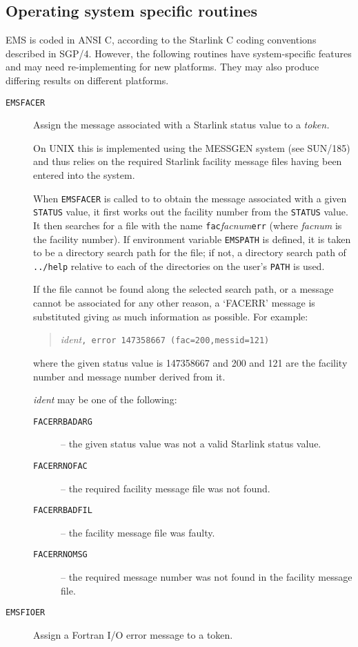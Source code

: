 \documentclass[twoside,11pt]{article}
\newcommand{\htmlref}[2]{#1}
\newcommand{\latex}[1]{#1}
\newcommand{\xref}[3]{#1}
\newcommand{\xlabel}[1]{}
\renewcommand{\_}{\texttt{\symbol{95}}}
\begin{document}
\subsection{\xlabel{operating_system_specific_routines}Operating system
specific routines}
\label{deps}
EMS is coded in ANSI C, according to the Starlink C coding conventions 
described in SGP/4.
However, the following routines have system-specific features and may need
re-implementing for new platforms.
They may also produce differing results on different platforms.
\begin {description}
\item [\htmlref{\texttt{EMS\_FACER}}{EMS_FACER}]  Assign the message
associated with a Starlink status value to a \textit{token.}

On UNIX this is implemented using the \xref{MESSGEN}{sun185}{} system
\latex{(see SUN/185)}
and thus relies on the required Starlink facility message files
having been entered into the system.

When \texttt{EMS\_FACER} is called to to obtain the message associated with a
given \texttt{STATUS} value, it first works out the facility number from the
\texttt{STATUS} value.
It then searches for a file with the name
\texttt{fac\_}\textit{facnum}\texttt{\_err} (where \textit{facnum} is the
facility number).
If environment variable \texttt{EMS\_PATH} is defined, it is taken to be a
directory search path for the file; 
if not, a directory search path of \texttt{../help} relative to each of the
directories on the user's \texttt{PATH} is used.

If the file cannot be found along the selected search path, or
a message cannot be associated for any other reason, a `FACERR' message is 
substituted giving as much information as possible. 
For example:
\begin{quote}
\textit{ident}\texttt{, error 147358667 (fac=200,messid=121)}
\end{quote}
where the given status value is 147358667 and 200 and 121 are the facility
number and message number derived from it.

\textit{ident} may be one of the following:
\begin{description}
\item[\texttt{FACERR\_\_BADARG}] --
the given status value was not a valid Starlink status value.
\item[\texttt{FACERR\_\_NOFAC}] --
the required facility message file was not found.
\item[\texttt{FACERR\_\_BADFIL}] -- 
the facility message file was faulty.
\item[\texttt{FACERR\_\_NOMSG}] -- 
the required message number was not found in the facility message file.
\end{description}
\item [\htmlref{\texttt{EMS\_FIOER}}{EMS_FIOER}]
Assign a Fortran I/O error message to a token.


\end{description}
\end{document}
